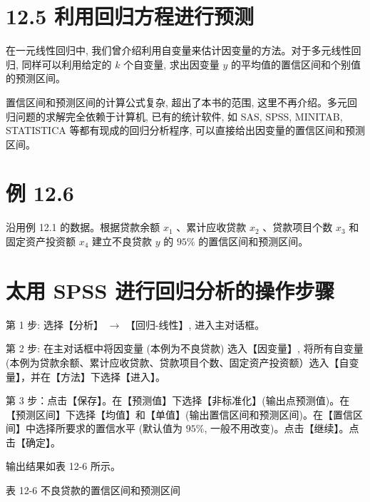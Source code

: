\documentclass[10pt]{article}
\begin{document}
\begin{CJK*}{UTF8}{bsmi}
\section*{12.5 利用回归方程进行预测}
在一元线性回归中, 我们曾介绍利用自变量来估计因变量的方法。对于多元线性回归, 同样可以利用给定的 $k$ 个自变量, 求出因变量 $y$ 的平均值的置信区间和个别值的预测区间。

置信区间和预测区间的计算公式复杂, 超出了本书的范围, 这里不再介绍。多元回归问题的求解完全依赖于计算机, 已有的统计软件, 如 SAS, SPSS, MINITAB, STATISTICA 等都有现成的回归分析程序, 可以直接给出因变量的置信区间和预测区间。

\section*{例 12.6}
沿用例 12.1 的数据。根据贷款余额 $x_{1}$ 、累计应收贷款 $x_{2}$ 、贷款项目个数 $x_{3}$ 和固定资产投资额 $x_{4}$ 建立不良贷款 $y$ 的 $95 \%$ 的置信区间和预测区间。

\section*{太用 SPSS 进行回归分析的操作步骤}
第 1 步: 选择【分析】 $\rightarrow$ 【回归-线性】, 进入主对话框。

第 2 步: 在主对话框中将因变量 (本例为不良贷款) 选入【因变量】, 将所有自变量 (本例为贷款余额、累计应收贷款、贷款项目个数、固定资产投资额）选入【自变量】，并在【方法】下选择【进入】。

第 3 步：点击【保存】。在【预测值】下选择【非标准化】(输出点预测值)。在【预测区间】下选择【均值】和【单值】(输出置信区间和预测区间)。在【置信区间】中选择所要求的置信水平 (默认值为 $95 \%$, 一般不用改变)。点击【继续】。点击【确定】。

输出结果如表 12-6 所示。

表 12-6 不良贷款的置信区间和预测区间


\end{CJK*}
\end{document}
